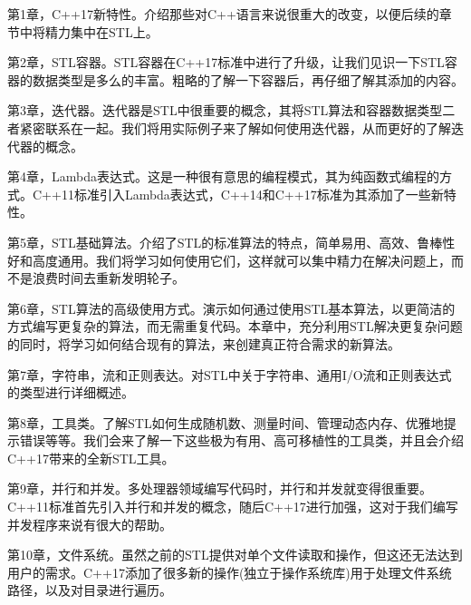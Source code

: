 \enlargethispage{\baselineskip}
第1章，C++17新特性。介绍那些对C++语言来说很重大的改变，以便后续的章节中将精力集中在STL上。

第2章，STL容器。STL容器在C++17标准中进行了升级，让我们见识一下STL容器的数据类型是多么的丰富。粗略的了解一下容器后，再仔细了解其添加的内容。

第3章，迭代器。迭代器是STL中很重要的概念，其将STL算法和容器数据类型二者紧密联系在一起。我们将用实际例子来了解如何使用迭代器，从而更好的了解迭代器的概念。

第4章，Lambda表达式。这是一种很有意思的编程模式，其为纯函数式编程的方式。C++11标准引入Lambda表达式，C++14和C++17标准为其添加了一些新特性。

第5章，STL基础算法。介绍了STL的标准算法的特点，简单易用、高效、鲁棒性好和高度通用。我们将学习如何使用它们，这样就可以集中精力在解决问题上，而不是浪费时间去重新发明轮子。

第6章，STL算法的高级使用方式。演示如何通过使用STL基本算法，以更简洁的方式编写更复杂的算法，而无需重复代码。本章中，充分利用STL解决更复杂问题的同时，将学习如何结合现有的算法，来创建真正符合需求的新算法。

第7章，字符串，流和正则表达。对STL中关于字符串、通用I/O流和正则表达式的类型进行详细概述。

第8章，工具类。了解STL如何生成随机数、测量时间、管理动态内存、优雅地提示错误等等。我们会来了解一下这些极为有用、高可移植性的工具类，并且会介绍C++17带来的全新STL工具。

第9章，并行和并发。多处理器领域编写代码时，并行和并发就变得很重要。C++11标准首先引入并行和并发的概念，随后C++17进行加强，这对于我们编写并发程序来说有很大的帮助。

第10章，文件系统。虽然之前的STL提供对单个文件读取和操作，但这还无法达到用户的需求。C++17添加了很多新的操作(独立于操作系统库)用于处理文件系统路径，以及对目录进行遍历。

